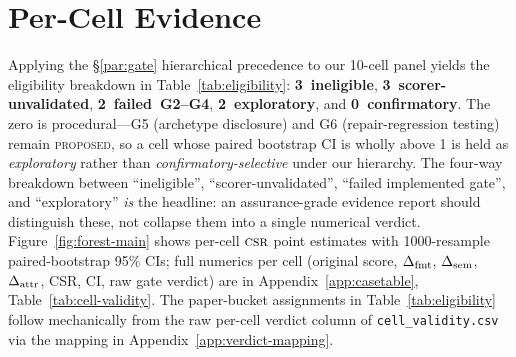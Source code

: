 \section{Per-Cell Evidence}
\label{sec:results}

Applying the \S\ref{par:gate} hierarchical precedence to our 10-cell
panel yields the eligibility breakdown in Table~\ref{tab:eligibility}:
\textbf{3~ineligible}, \textbf{3~scorer-unvalidated},
\textbf{2~failed~G2--G4}, \textbf{2~exploratory}, and
\textbf{0~confirmatory}. The zero is procedural---G5 (archetype
disclosure) and G6 (repair-regression testing) remain
\textsc{proposed}, so a cell whose paired bootstrap CI is wholly
above 1 is held as \emph{exploratory} rather than
\emph{confirmatory-selective} under our hierarchy. The four-way
breakdown between ``ineligible'', ``scorer-unvalidated'', ``failed
implemented gate'', and ``exploratory'' \emph{is} the headline: an
assurance-grade evidence report should distinguish these, not
collapse them into a single numerical verdict.
Figure~\ref{fig:forest-main} shows per-cell $\textsc{csr}$ point estimates
with 1000-resample paired-bootstrap 95\% CIs; full numerics per cell
(original score, $\Delta_{\mathrm{fmt}}$, $\Delta_{\mathrm{sem}}$, $\Delta_{\mathrm{attr}}$, CSR, CI, raw gate
verdict) are in Appendix~\ref{app:casetable},
Table~\ref{tab:cell-validity}. The paper-bucket assignments in
Table~\ref{tab:eligibility} follow mechanically from the raw
per-cell verdict column of \texttt{cell\_validity.csv} via the
mapping in Appendix~\ref{app:verdict-mapping}.

